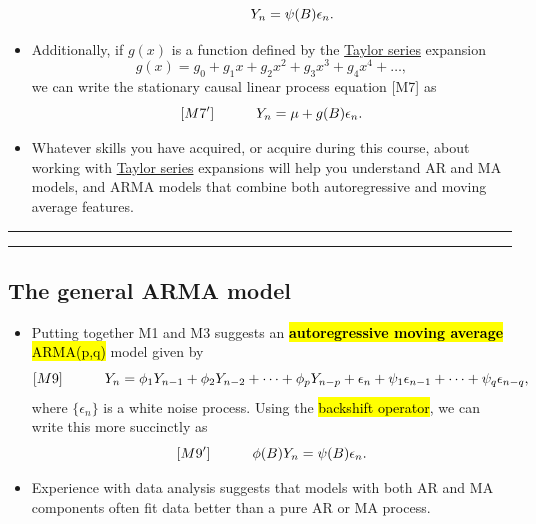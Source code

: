 \documentclass[]{article}
\begin{document}
\begin{itemize}
$$  \quad\quad\quad Y_n = \psi(B) \epsilon_n. $$
\item
  Additionally, if \(g(x)\) is a function defined by the
  \href{https://en.wikipedia.org/wiki/Taylor_series}{Taylor series}
  expansion \[g(x)= g_0 + g_1 x + g_2 x^2 + g_3 x^3 + g_4 x^4 + \dots,\]
  we can write the stationary causal linear process equation {[}M7{]} as
  $${[}M7^\prime{]} \quad\quad\quad Y_n = \mu + g(B)\epsilon_n.$$ 
\item
  Whatever skills you have acquired, or acquire during this course,
  about working with
  \href{https://en.wikipedia.org/wiki/Taylor_series}{Taylor series}
  expansions will help you understand AR and MA models, and ARMA models
  that combine both autoregressive and moving average features.
\end{itemize}

\begin{center}\rule{0.5\linewidth}{\linethickness}\end{center}

\begin{center}\rule{0.5\linewidth}{\linethickness}\end{center}

\subsection{The general ARMA model}\label{the-general-arma-model}
\begin{itemize}
\item
  Putting together M1 and M3 suggests an \hl{\textbf{autoregressive moving
  average} ARMA(p,q)} model given by $${[}M9{]}
  \quad\quad\quad Y_n = \phi_1 Y_{n-1}+\phi_2Y_{n-2}+\dots+\phi_pY_{n-p} + \epsilon_n +\psi_1 \epsilon_{n-1} +\dots+\psi_q\epsilon_{n-q},$$
  where \(\{\epsilon_n\}\) is a white noise process. Using the \hl{backshift
  operator}, we can write this more succinctly as $${[}M9^\prime{]}
  \quad\quad\quad \phi(B) Y_n = \psi(B) \epsilon_n.$$ 
  
  
\item
  Experience with data analysis suggests that models with both AR and MA
  components often fit data better than a pure AR or MA process.
\end{itemize}
\end{document}
